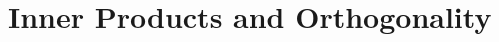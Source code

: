 \chapter{Inner Products and Orthogonality} \label{Ortho:chapter}
\renewcommand{\thesection}{\thechapter.\the\value{section}}





\sectionnewpage




\sectionnewpage




